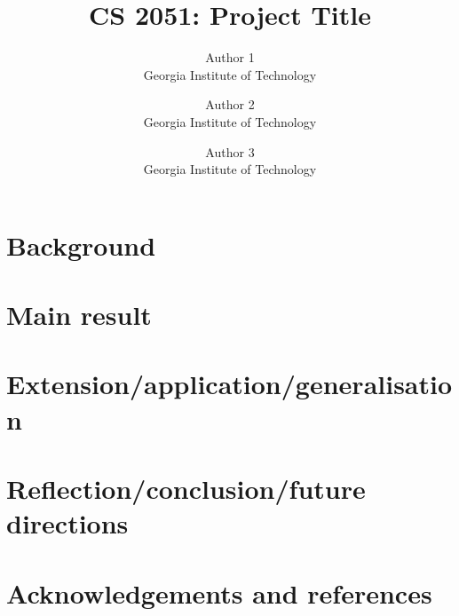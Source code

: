 \documentclass{article}
\title{CS 2051: Project Title}
\author{Author 1 \\ Georgia Institute of Technology
\and Author 2 \\ Georgia Institute of Technology
\and Author 3 \\ Georgia Institute of Technology}
\date{}
\begin{document}
\maketitle


\section{Background}



\section{Main result}



\section{Extension/application/generalisation}



\section{Reflection/conclusion/future directions}



\section{Acknowledgements and references}
\end{document}
